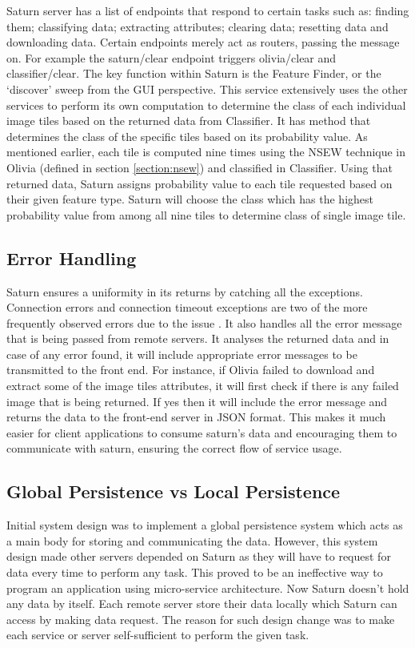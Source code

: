 Saturn server has a list of endpoints that respond to certain tasks such as: finding them; classifying data; extracting attributes; clearing data; resetting data and downloading data. Certain endpoints merely act as routers, passing the message on. For example the saturn/clear endpoint triggers olivia/clear and classifier/clear. 
The key function within Saturn is the Feature Finder, or the `discover’ sweep from the GUI perspective. This service extensively uses the other services to perform its own computation to determine the class of each individual image tiles based on the returned data from Classifier. It has method that determines the class of the specific tiles based on its probability value. As mentioned earlier, each tile is computed nine times using the NSEW technique in Olivia (defined in section \ref{section:nsew}) and classified in Classifier. Using that returned data, Saturn assigns probability value to each tile requested based on their given feature type. Saturn will choose the class which has the highest probability value from among all nine tiles to determine class of single image tile.

\subsection{Error Handling}
Saturn ensures a uniformity in its returns by catching all the exceptions. Connection errors and connection timeout exceptions are two of the more frequently observed errors due to the issue . It also handles all the error message that is being passed from remote servers. It analyses the returned data and in case of any error found, it will include appropriate error messages to be transmitted to the front end. For instance, if Olivia failed to download and extract some of the image tiles attributes, it will first check if there is any failed image that is being returned. If yes then it will include the error message and returns the data to the front-end server in JSON format. This makes it much easier for client applications to consume saturn's data and encouraging them to communicate with saturn, ensuring the correct flow of service usage.

\subsection{Global Persistence vs Local Persistence}
Initial system design was to implement a global persistence system which acts as a main body for storing and communicating the data. However, this system design made other servers depended on Saturn as they will have to request for data every time to perform any task. This proved to be an ineffective way to program an application using micro-service architecture. Now Saturn doesn’t hold any data by itself. Each remote server store their data locally which Saturn can access by making data request. The reason for such design change was to make each service or server self-sufficient to perform the given task.
